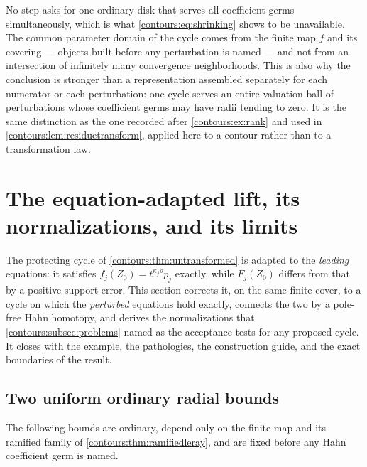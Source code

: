 \documentclass[11pt,letterpaper]{article}
\theoremstyle{definition}
\theoremstyle{remark}
\numberwithin{equation}{section}
\begin{document}
No step asks for one ordinary disk that serves all coefficient germs
simultaneously, which is what \eqref{contours:eq:shrinking} shows to be
unavailable. The common parameter domain of the cycle comes from the finite map
$f$ and its covering --- objects built before any perturbation is named --- and
not from an intersection of infinitely many convergence neighborhoods. This is
also why the conclusion is stronger than a representation assembled separately
for each numerator or each perturbation: one cycle serves an entire valuation
ball of perturbations whose coefficient germs may have radii tending to zero.
It is the same distinction as the one recorded after \cref{contours:ex:rank} and
used in \cref{contours:lem:residuetransform}, applied here to a contour rather
than to a transformation law.

\section{The equation-adapted lift, its normalizations, and its limits}
\label{contours:sec:adapted}

The protecting cycle of \cref{contours:thm:untransformed} is adapted to the
\emph{leading} equations: it satisfies $f_j(Z_0)=t^{\kappa_j\rho}p_j$ exactly,
while $F_j(Z_0)$ differs from that by a positive-support error. This section
corrects it, on the same finite cover, to a cycle on which the \emph{perturbed}
equations hold exactly, connects the two by a pole-free Hahn homotopy, and
derives the normalizations that \cref{contours:subsec:problems} named as the
acceptance tests for any proposed cycle. It closes with the example, the
pathologies, the construction guide, and the exact boundaries of the result.

\subsection{Two uniform ordinary radial bounds}
\label{contours:subsec:radialbounds}
The following bounds are ordinary, depend only on the finite map and its ramified
family of \cref{contours:thm:ramifiedleray}, and are fixed before any Hahn
coefficient germ is named.
\end{document}

